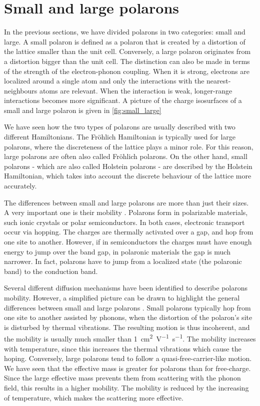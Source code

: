 \section{Small and large polarons}
In the previous sections, we have divided polarons in two categories: small and large. A small polaron is defined as a polaron that is created by a distortion of the lattice smaller than the unit cell. Conversely, a large polaron originates from a distortion bigger than the unit cell. The distinction can also be made in terms of the strength of the electron-phonon coupling. When it is strong, electrons are localized around a single atom and only the interactions with the nearest-neighbours atoms are relevant. When the interaction is weak, longer-range interactions becomes more significant. A picture of the charge isosurfaces of a small and large polaron is given in \cref{fig:small_large}

We have seen how the two types of polarons are usually described with two different Hamiltonians. The Fröhlich Hamiltonian is typically used for large polarons, where the discreteness of the lattice plays a minor role. For this reason, large polarons are often also called Fröhlich polarons. On the other hand, small polarons - which are also called Holstein polarons - are described by the Holstein Hamiltonian, which takes into account the discrete behaviour of the lattice more accurately.

The differences between small and large polarons are more than just their sizes. A very important one is their mobility \cite{natanzon2020}. Polarons form in polarizable materials, such ionic crystals or polar semiconductors. In both cases, electronic transport occur via hopping. The charges are thermally activated over a gap, and hop from one site to another. However, if in semiconductors the charges must have enough energy to jump over the band gap, in polaronic materials the gap is much narrower. In fact, polarons have to jump from a localized state (the polaronic band) to the conduction band.

Several different diffusion mechanisms have been identified to describe polarons mobility. However, a simplified picture can be drawn to highlight the general differences between small and large polarons \cite{franchini2021b}. Small polarons typically hop from one site to another assisted by phonons, when the distortion of the polaron's site is disturbed by thermal vibrations. The resulting motion is thus incoherent, and the mobility is usually much smaller than \SI{1}{cm^2 V^{-1}s^{-1}}. The mobility increases with temperature, since this increases the thermal vibrations which cause the hoping. Conversely, large polarons tend to follow a quasi-free-carrier-like motion. We have seen that the effective mass is greater for polarons than for free-charge. Since the large effective mass prevents them from scattering with the phonon field, this results in a higher mobility. The mobility is reduced by the increasing of temperature, which makes the scattering more effective.

